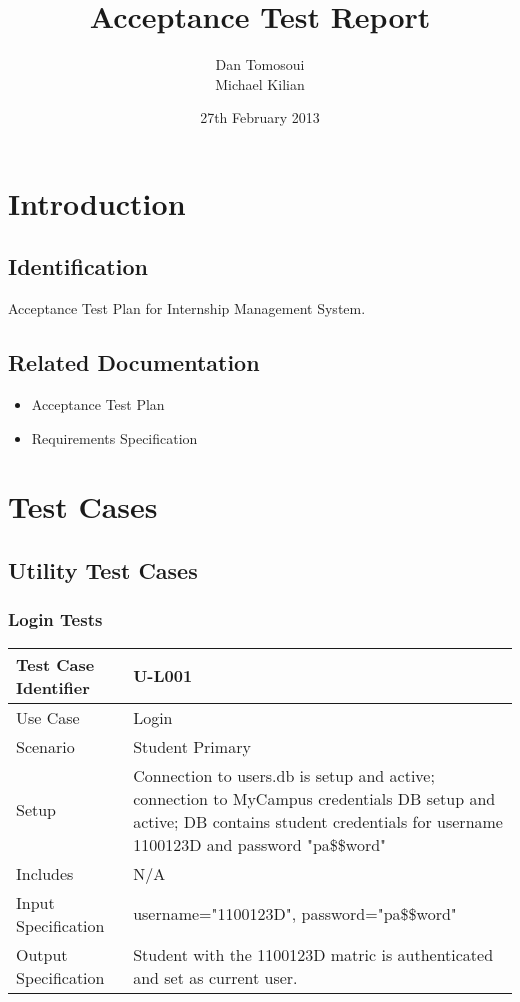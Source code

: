 \documentclass{l3deliverable}
\title{Acceptance Test Report}
\author{
  Dan Tomosoui\\
  Michael Kilian \\
}
\date{27th February 2013}
\begin{document}

\maketitle

\tableofcontents

\newpage


\section{Introduction}

\subsection{Identification}
Acceptance Test Plan for Internship Management System.

\subsection{Related Documentation}
\begin{itemize}
\item{Acceptance Test Plan}
\item{Requirements Specification}
\end{itemize}

\section{Test Cases}

\subsection{Utility Test Cases}
\subsubsection{Login Tests}
\begin{tabular}{lp{10cm}}
\hline 
\textbf{Test Case Identifier} & U-L001\tabularnewline
\hline 
\hline 
Use Case & Login \tabularnewline
\hline 
Scenario & Student Primary \tabularnewline
\hline 
Setup &  Connection to users.db is setup and active; connection to MyCampus credentials DB setup and active; DB contains student credentials for username 1100123D and password "pa\$\$word" \tabularnewline
\hline 
Includes &  N/A \tabularnewline
\hline 
Input Specification & username="1100123D", password="pa\$\$word"\tabularnewline
\hline 
Output Specification & Student with the 1100123D matric is authenticated and set as current user.\tabularnewline
\hline 
\end{tabular}\\
\end{document}
